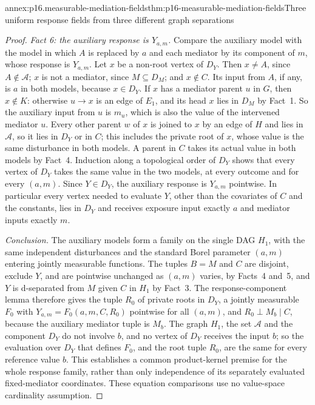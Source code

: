 \begin{annexitem}{annex:p16.measurable-mediation-fields}{thm:p16-measurable-mediation-fields}{Three uniform response fields from three different graph separations}
\begin{proof}
\emph{Fact 6: the auxiliary response is \(Y_{a,m}\).} Compare the
auxiliary model with the model in which \(A\) is replaced by \(a\) and
each mediator by its component of \(m\), whose response is \(Y_{a,m}\).
Let \(x\) be a non-root vertex of \(D_Y\). Then \(x\neq A\), since
\(A\notin\mathcal A\); \(x\) is not a mediator, since
\(M\subseteq D_M\); and \(x\notin C\). Its input from \(A\), if any, is
\(a\) in both models, because \(x\in D_Y\). If \(x\) has a mediator
parent \(u\) in \(G\), then \(x\notin K\): otherwise \(u\to x\) is an
edge of \(E_1\), and its head \(x\) lies in \(D_M\) by Fact~1. So the
auxiliary input from \(u\) is \(m_u\), which is also the value of the
intervened mediator \(u\). Every other parent \(w\) of \(x\) is joined to
\(x\) by an edge of \(H\) and lies in \(\mathcal A\), so it lies in
\(D_Y\) or in \(C\); this includes the private root of \(x\), whose value
is the same disturbance in both models. A parent in \(C\) takes its
actual value in both models by Fact~4. Induction along a topological
order of \(D_Y\) shows that every vertex of \(D_Y\) takes the same value
in the two models, at every outcome and for every \((a,m)\). Since
\(Y\in D_Y\), the auxiliary response is \(Y_{a,m}\) pointwise. In
particular every vertex needed to evaluate \(Y\), other than the
covariates of \(C\) and the constants, lies in \(D_Y\) and receives
exposure input exactly \(a\) and mediator inputs exactly \(m\).

\emph{Conclusion.} The auxiliary models form a family on the single DAG
\(H_1\), with the same independent disturbances and the standard Borel
parameter \((a,m)\) entering jointly measurable functions. The tuples
\(B=M\) and \(C\) are disjoint, exclude \(Y\), and are pointwise
unchanged as \((a,m)\) varies, by Facts~4 and~5, and \(Y\) is
d-separated from \(M\) given \(C\) in \(H_1\) by Fact~3. The
response-component lemma therefore gives the tuple \(R_0\) of private
roots in \(D_Y\), a jointly measurable \(F_0\) with
\(Y_{a,m}=F_0(a,m,C,R_0)\) pointwise for all \((a,m)\), and
\(R_0\perp M_b\mid C\), because the auxiliary mediator tuple is \(M_b\).
The graph \(H_1\), the set \(\mathcal A\) and the component \(D_Y\) do
not involve \(b\), and no vertex of \(D_Y\) receives the input \(b\);
so the evaluation over \(D_Y\) that defines \(F_0\), and the root tuple
\(R_0\), are the same for every reference value \(b\). This establishes
a common product-kernel premise for the whole response family, rather
than only independence of its separately evaluated fixed-mediator
coordinates. These equation comparisons use no value-space cardinality
assumption.


\end{proof}
\end{annexitem}
